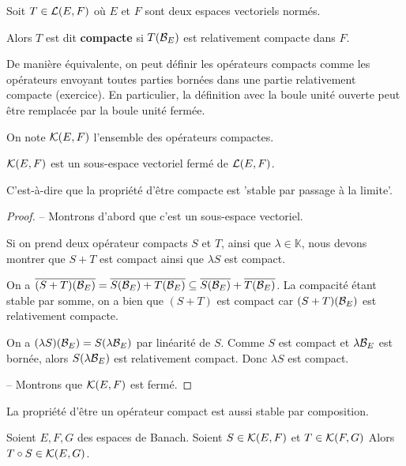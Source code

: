 \begin{definition}
	Soit $T \in \mathcal{L}(E, F)$ où $E$ et $F$ sont deux espaces
	vectoriels normés.

	Alors $T$ est dit \textbf{compacte} si $T(\mathcal{B}_{E})$ est relativement compacte
	dans $F$.
\end{definition}

De manière équivalente, on peut définir les opérateurs compacts comme les
opérateurs envoyant toutes parties bornées dans une partie relativement
compacte (exercice).
En particulier, la définition avec la boule unité ouverte peut
être remplacée par la boule unité fermée.

On note $\mathcal{K}(E, F)$ l'ensemble des opérateurs compactes.

\begin{proposition}
	$\mathcal{K}(E, F)$ est un sous-espace vectoriel fermé de
	$\mathcal{L}(E, F)$.

	C'est-à-dire que la propriété d'être compacte est 'stable par passage à la
	limite'.
\end{proposition}

\begin{proof}
	-- Montrons d'abord que c'est un sous-espace vectoriel.

	Si on prend deux opérateur compacts $S$ et $T$, ainsi que $\lambda \in
	\mathbb{K}$, nous devons montrer que $S + T$ est compact ainsi que $\lambda S$
	est compact.

	On a $\overline{(S + T)(\mathcal{B}_{E})} =  \overline{S(\mathcal{B}_{E}) +
	T(\mathcal{B}_{E})} \subseteq \overline{S(\mathcal{B}_{E})} +
	\overline{T(\mathcal{B}_{E})}$. La compacité étant stable par somme, on a bien
	que $(S + T)$ est compact car $(S + T)(\mathcal{B}_{E})$ est relativement
	compacte.

	On a $(\lambda S)(\mathcal{B}_{E}) = S(\lambda \mathcal{B}_{E})$ par
	linéarité de $S$. Comme $S$ est compact et $\lambda \mathcal{B}_{E}$ est
	bornée, alors $S(\lambda \mathcal{B}_{E})$ est relativement compact. Donc
	$\lambda S$ est compact.

	-- Montrons que $\mathcal{K}(E, F)$ est fermé.
\end{proof}

La propriété d'être un opérateur compact est aussi stable par composition.

\begin{proposition}
	Soient $E, F, G$ des espaces de Banach.
	Soient $S \in \mathcal{K}(E, F)$ et $T \in \mathcal{K}(F, G)$
	Alors $T \circ S \in \mathcal{K}(E, G)$.
\end{proposition}

